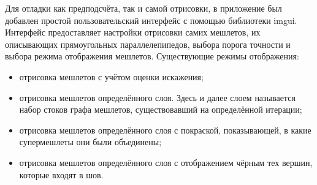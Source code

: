 Для отладки как предподсчёта, так и самой отрисовки, в приложение был добавлен простой пользовательский интерфейс с помощью библиотеки imgui.
Интерфейс предоставляет настройки отрисовки самих мешлетов, их описывающих прямоугольных параллелепипедов, выбора порога точности и выбора режима отображения мешлетов.
Существующие режимы отображения:
\begin{itemize}
    \item отрисовка мешлетов с учётом оценки искажения;
    \item отрисовка мешлетов определённого слоя.
    Здесь и далее слоем называется набор стоков графа мешлетов, существовавший на определённой итерации;
    \item отрисовка мешлетов определённого слоя с покраской, показывающей, в какие супермешлеты они были объединены;
    \item отрисовка мешлетов определённого слоя с отображением чёрным тех вершин, которые входят в шов.
\end{itemize}
